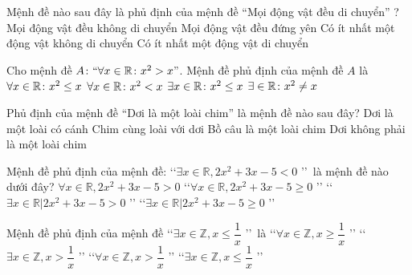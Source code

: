 \begin{ex}%
	Mệnh đề nào sau đây là phủ định của  mệnh đề “Mọi động vật đều di chuyển” ?
	 \choice
		{ Mọi động vật đều không di  chuyển}
		{ Mọi động vật đều đứng  yên}
		{ \True Có  ít nhất một động vật không di chuyển}
		{ Có ít nhất một động vật di  chuyển}
\end{ex}

\begin{ex}%
	Cho mệnh đề $A\colon ``\forall x\in \Bbb{R}\colon x^2>x"$. Mệnh đề  phủ định của mệnh đề $A$ là
	\choice 
		{$\forall  x\in \Bbb{R}\colon x^2\le x$}
		{$\forall  x\in \Bbb{R}\colon x^2< x$}
		{\True $\exists x\in \Bbb{R}\colon x^2\le x$} 
		{$\exists\in \Bbb{R}\colon x^2\neq x$} 
\end{ex}

\begin{ex}%
	Phủ định của mệnh đề “Dơi là một loài chim” là  mệnh đề nào sau đây?
	\choice 
		{Dơi  là một loài có cánh}
		{Chim cùng loài với  dơi}
		{Bồ câu là  một loài chim}
		{\True Dơi không  phải là một loài chim}
\end{ex}

\begin{ex}%
	Mệnh đề phủ định của mệnh đề: \lq\lq $\exists x \in \mathbb{R}  , 2 x^2+3 x-5<0 $ \rq\rq \, là mệnh đề nào dưới đây?
	\choice 
		{$\forall x  \in \mathbb{R} , 2 x^2+3 x-5>0$}
		{\True \lq\lq $ \forall x \in \mathbb{R} , 2 x^2+3x-5  \geq 0 $ \rq\rq}
		{\lq\lq $\exists x \in \mathbb{R} | 2 x^2+3 x-5>0 $  \rq\rq}
		{\lq\lq $\exists x \in \mathbb{R} | 2 x^{2}+3 x-5  \geq 0$ \rq\rq}
\end{ex}

\begin{ex}%
	 Mệnh đề phủ định của mệnh đề \lq\lq $\exists x \in \mathbb{Z}, x \le \dfrac{1}{x}$ \rq \rq\ là
	\choice 
		{\lq \lq  $\forall x \in \mathbb{Z}, x \ge \dfrac{1}{x} $ \rq \rq}
		{\lq \lq $\exists x \in  \mathbb{Z}, x > \dfrac{1}{x}$ \rq \rq}
		{\True \lq  \lq $\forall x \in \mathbb{Z}, x >\dfrac{1}{x}$ \rq \rq}
		{\lq \lq $\exists  x \in \mathbb{Z}, x \le \dfrac{1}{x}$ \rq \rq}
\end{ex}

